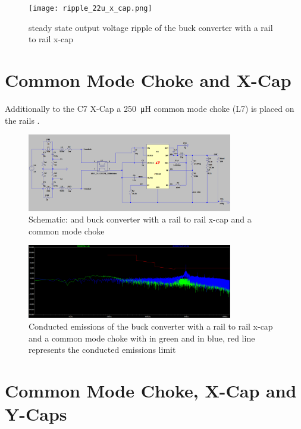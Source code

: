 \begin{figure}
    \centering
    \texttt{[image: ripple\_22u\_x\_cap.png]}
    \caption{steady state output voltage ripple of the buck converter with a rail to rail x-cap}
    \label{fig:x_cap_ripple}
\end{figure}

\section{Common Mode Choke and X-Cap}
\label{section:cmc_x_cap}
Additionally to the C7 X-Cap a \qty{250}{\micro\henry} common mode choke (L7) is placed on the rails \autocite{744235251WurthElektronik}.

\begin{figure}[htbp]
    \centering
    \includegraphics[width=0.8\textwidth]{img/schematic_cmc_22u_x_cap.png}
    \caption{Schematic:  and buck converter with a rail to rail x-cap and a common mode choke}
    \label{fig:cmc_x_cap_schematic}
\end{figure}

\begin{figure}[htbp]
    \centering
    \includegraphics[width=0.8\textwidth]{img/emi_cmc_22u_x_cap.png}
    \caption{Conducted emissions of the buck converter with a rail to rail x-cap and a common mode choke with  in green and  in blue, red line represents the conducted emissions limit}
    \label{fig:cmc_x_cap_emc}
\end{figure}

\newpage

\section{Common Mode Choke, X-Cap and Y-Caps}
\label{section:cmc_x_cap_y_cap}

